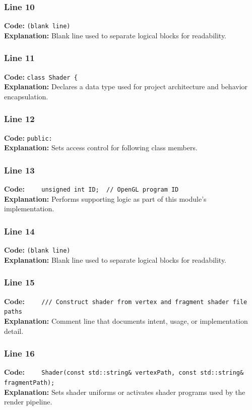 \documentclass[11pt,a4paper]{article}
\begin{document}
\subsubsection*{Line 10}
\textbf{Code:} \texttt{(blank line)}\\
\textbf{Explanation:} Blank line used to separate logical blocks for readability.

\subsubsection*{Line 11}
\textbf{Code:} \verb|class Shader {|\\
\textbf{Explanation:} Declares a data type used for project architecture and behavior encapsulation.

\subsubsection*{Line 12}
\textbf{Code:} \verb|public:|\\
\textbf{Explanation:} Sets access control for following class members.

\subsubsection*{Line 13}
\textbf{Code:} \verb|    unsigned int ID;  // OpenGL program ID|\\
\textbf{Explanation:} Performs supporting logic as part of this module's implementation.

\subsubsection*{Line 14}
\textbf{Code:} \texttt{(blank line)}\\
\textbf{Explanation:} Blank line used to separate logical blocks for readability.

\subsubsection*{Line 15}
\textbf{Code:} \verb|    /// Construct shader from vertex and fragment shader file paths|\\
\textbf{Explanation:} Comment line that documents intent, usage, or implementation detail.

\subsubsection*{Line 16}
\textbf{Code:} \verb|    Shader(const std::string& vertexPath, const std::string& fragmentPath);|\\
\textbf{Explanation:} Sets shader uniforms or activates shader programs used by the render pipeline.
\end{document}
